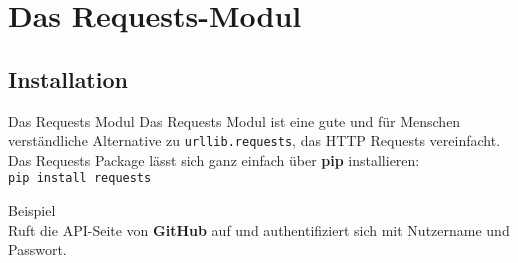 \section{Das Requests-Modul}
\subsection{Installation}
\begin{frame}{Das Requests Modul}
	Das Requests Modul ist eine gute und f\"ur Menschen verst\"andliche Alternative
	zu \texttt{urllib.requests}, das HTTP Requests vereinfacht. \\[.75cm]

	Das Requests Package l\"asst sich ganz einfach \"uber \textbf{pip} installieren: \\
	\texttt{pip install requests}
\end{frame}

\begin{frame}{Beispiel}
	 \ \\[.5cm]
	Ruft die API-Seite von \textbf{GitHub} auf und authentifiziert sich mit Nutzername und Passwort.
\end{frame}


